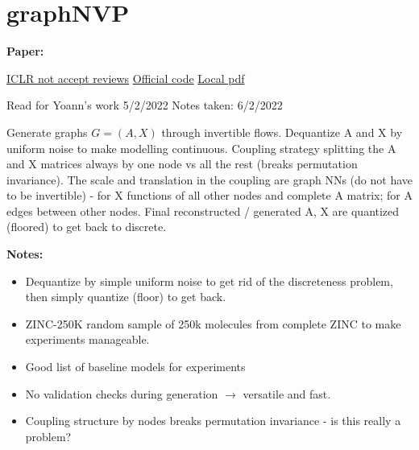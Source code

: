 \clearpage

\section{graphNVP}\label{sec:graphNVP}

\begin{notebox}
\textbf{Paper: } 
\vspace{5pt}

\href{https://openreview.net/forum?id=ryxQ6T4YwB}{ICLR not accept reviews}
\hspace{1cm}
\href{https://github.com/pfnet-research/graph-nvp}{Official code}
\hspace{1cm}
\href{run:/home/magda/Dropbox/Zot/Madhawa et al_2019_GraphNVP.pdf}{Local pdf}
\vspace{3pt}

Read for Yoann's work 5/2/2022
\hfill Notes taken: 6/2/2022 
\end{notebox}

\begin{notebox}[colback=red!5]
\tldr Generate graphs $G = (A, X)$ through invertible flows. Dequantize A and X by uniform noise to make modelling continuous. Coupling strategy splitting the A and X matrices always by one node vs all the rest (breaks permutation invariance). The scale and translation in the coupling are graph NNs (do not have to be invertible) - for X functions of all other nodes and complete A matrix; for A edges between other nodes. Final reconstructed / generated A, X are quantized (floored) to get back to discrete.
\end{notebox}

\begin{notebox}[colback=yellow!5]
\textbf{Notes:} 
\begin{itemize}[nosep]
\item Dequantize by simple uniform noise to get rid of the discreteness problem, then simply quantize (floor) to get back.
\item ZINC-250K random sample of 250k molecules from complete ZINC to make experiments manageable. 
\item Good list of baseline models for experiments
\item No validation checks during generation $\to$ versatile and fast.
\item Coupling structure by nodes breaks permutation invariance - is this really a problem?
\end{itemize}
\end{notebox}

